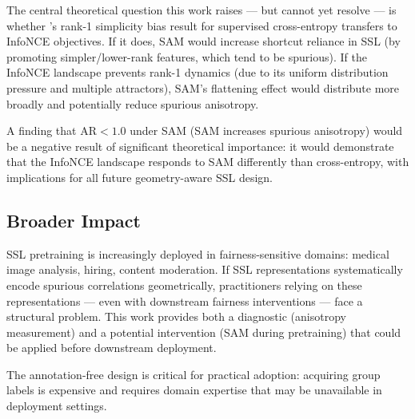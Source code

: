 The central theoretical question this work raises --- but cannot yet resolve --- is whether \citet{gatmiry2024sam}'s rank-1 simplicity bias result for supervised cross-entropy transfers to InfoNCE objectives. If it does, SAM would increase shortcut reliance in SSL (by promoting simpler/lower-rank features, which tend to be spurious). If the InfoNCE landscape prevents rank-1 dynamics (due to its uniform distribution pressure and multiple attractors), SAM's flattening effect would distribute more broadly and potentially reduce spurious anisotropy.

A finding that $\text{AR} < 1.0$ under SAM (SAM increases spurious anisotropy) would be a negative result of significant theoretical importance: it would demonstrate that the InfoNCE landscape responds to SAM differently than cross-entropy, with implications for all future geometry-aware SSL design.

\subsection{Broader Impact}

SSL pretraining is increasingly deployed in fairness-sensitive domains: medical image analysis, hiring, content moderation. If SSL representations systematically encode spurious correlations geometrically, practitioners relying on these representations --- even with downstream fairness interventions --- face a structural problem. This work provides both a diagnostic (anisotropy measurement) and a potential intervention (SAM during pretraining) that could be applied before downstream deployment.

The annotation-free design is critical for practical adoption: acquiring group labels is expensive and requires domain expertise that may be unavailable in deployment settings.
